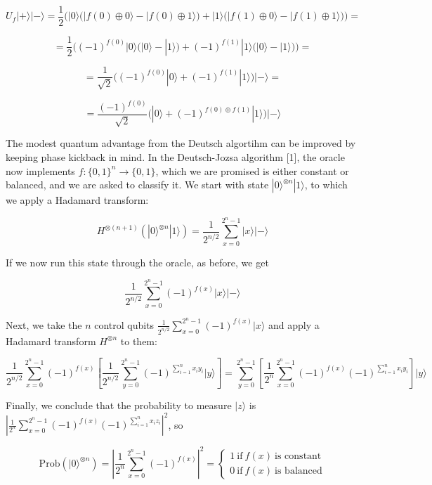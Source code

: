 \documentclass[11pt,dvipsnames]{article}
\begin{document}
\[
U_f|+\rangle|-\rangle = \frac{1}{2}
\bigg(|0\rangle\big(|f(0)\oplus 0\rangle-|f(0)\oplus 1\rangle\big)+|1\rangle\big(|f(1)\oplus 0\rangle-|f(1)\oplus 1\rangle\big)\bigg) = 
\]

\[
=  \frac{1}{2}
\bigg((-1)^{f(0)} |0\rangle\big(|0\rangle-|1\rangle\big)+(-1)^{f(1)} |1\rangle\big(|0\rangle-|1\rangle\big)\bigg) = 
\]

\[
= \frac{1}{\sqrt{2}}\bigg((-1)^{f(0)} |0\rangle+(-1)^{f(1)} |1\rangle\bigg)|-\rangle =
\]

\[
= \frac{(-1)^{f(0)}}{\sqrt{2}}\bigg(|0\rangle+(-1)^{f(0)\oplus f(1)} |1\rangle\bigg)|-\rangle
\]

The modest quantum advantage from the Deutsch algortihm can be improved by
keeping phase kickback in mind. In the Deutsch-Jozsa algorithm {[}1{]},
the oracle now implements \(f:\{0,1\}^n\rightarrow\{0,1\}\), which we
are promised is either constant or balanced, and we are asked to
classify it. We start with state \(|0\rangle^{\otimes n}|1\rangle\), to
which we apply a Hadamard transform:

\[
H^{\otimes(n+1)}(|0\rangle^{\otimes n}|1\rangle) = \frac{1}{2^{n/2}}\sum\limits_{x=0}^{2^n-1}|x\rangle|-\rangle
\]

If we now run this state through the oracle, as before, we get

\[
 \frac{1}{2^{n/2}}\sum\limits_{x=0}^{2^n-1}(-1)^{f(x)}|x\rangle|-\rangle
\]

Next, we take the $n$ control qubits $\frac{1}{2^{n/2}}\sum\limits_{x=0}
^{2^n-1}(-1)^{f(x)}|x\rangle$ and apply a Hadamard transform $H^{\otimes n}$ to them:

$$
\frac{1}{2^{n/2}}\sum\limits_{x=0}^{2^n-1}(-1)^{f(x)}
\left[\frac{1}{2^{n/2}}\sum\limits_{y=0}^{2^n-1}(-1)^{\sum\limits_{i=1}^n x_iy_i}|y\rangle\right] = 
\sum\limits_{y=0}^{2^n-1}\left[\frac{1}{2^n}\sum\limits_{x=0}^{2^n-1}(-1)^{f(x)}(-1)^{\sum\limits_{i=1}^n x_iy_i}\right]|y\rangle
$$

Finally, we conclude that the probability to measure $|z\rangle$ is 
$\left|\frac{1}{2^n}\sum\limits_{x=0}^{2^n-1}(-1)^{f(x)}(-1)^{\sum\limits_{i=1}^n x_iz_i}\right|^2$, so

\[
\mathrm{Prob}(|0\rangle^{\otimes n}) =  
\left|\frac{1}{2^n}\sum\limits_{x=0}^{2^n-1}(-1)^{f(x)}\right|^2 =
\begin{cases}
1\ \text{if}\ f(x)\ \text{is constant} \\[1em]
0\ \text{if}\ f(x)\ \text{is balanced}
\end{cases}
\]
\end{document}
